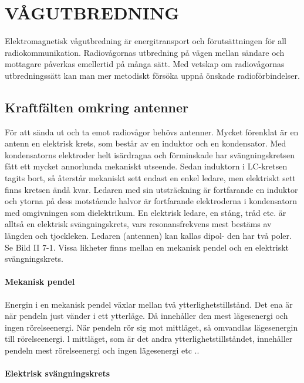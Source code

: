 \chapter{VÅGUTBREDNING}

Elektromagnetisk vågutbredning är energitransport och förutsättningen för all radiokommunikation. Radiovågornas utbredning
på vägen mellan sändare och mottagare
påverkas emellertid på många sätt. Med
vetskap om radiovågornas utbredningssätt
kan man mer metodiskt försöka uppnå önskade radioförbindelser.

\section{Kraftfälten omkring antenner}

För att sända ut och ta emot radiovågor
behövs antenner. Mycket förenklat är en
antenn en elektrisk krets, som består av en
induktor och en kondensator.
Med kondensatorns elektroder helt isärdragna och förminskade har svängningskretsen fått ett mycket annorlunda mekaniskt utseende. Sedan induktorn i LC-kretsen tagits bort, så återstår mekaniskt sett
endast en enkel ledare, men elektriskt sett
finns kretsen ändå kvar. Ledaren med sin
utsträckning är fortfarande en induktor och
ytorna på dess motstående halvor är fortfarande elektroderna i kondensatorn med omgivningen som dielektrikum.
En elektrisk ledare, en stång, tråd etc. är
alltså en elektrisk svängningskrets, vars resonansfrekvens mest bestäms av längden
och tjockleken. Ledaren (antennen) kan kallas dipol- den har två poler. Se Bild II 7-1.
Vissa likheter finns mellan en mekanisk
pendel och en elektriskt svängningskrets.

\subsubsection{Mekanisk pendel}

Energin i en mekanisk pendel växlar mellan
två ytterlighetstillstånd. Det ena är när pendeln just vänder i ett ytterläge. Då innehåller
den mest lägesenergi och ingen rörelseenergi. När pendeln rör sig mot mittläget, så
omvandlas lägesenergin till rörelseenergi. l
mittläget, som är det andra ytterlighetstillståndet, innehåller pendeln mest rörelseenergi och ingen lägesenergi etc ..

\subsubsection{Elektrisk svängningskrets}

